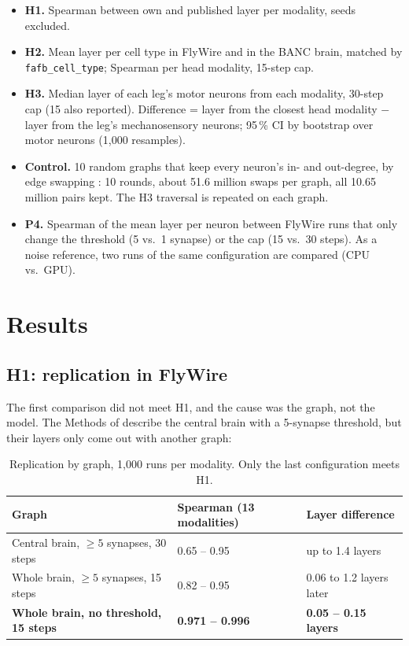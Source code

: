 \documentclass[11pt,letterpaper]{article}
\begin{document}
\begin{itemize}
  \item \textbf{H1.} Spearman between own and published layer per modality, seeds excluded.
  \item \textbf{H2.} Mean layer per cell type in FlyWire and in the BANC brain, matched by \texttt{fafb\_cell\_type}; Spearman per head modality, 15-step cap.
  \item \textbf{H3.} Median layer of each leg's motor neurons from each modality, 30-step cap (15 also reported). Difference = layer from the closest head modality $-$ layer from the leg's mechanosensory neurons; 95\,\% CI by bootstrap over motor neurons (1{,}000 resamples).
  \item \textbf{Control.} 10 random graphs that keep every neuron's in- and out-degree, by edge swapping \citep{maslov2002}: 10 rounds, about 51.6 million swaps per graph, all 10.65 million pairs kept. The H3 traversal is repeated on each graph.
  \item \textbf{P4.} Spearman of the mean layer per neuron between FlyWire runs that only change the threshold (5 vs.\ 1 synapse) or the cap (15 vs.\ 30 steps). As a noise reference, two runs of the same configuration are compared (CPU vs.\ GPU).
\end{itemize}

\section{Results}

\subsection{H1: replication in FlyWire}

The first comparison did not meet H1, and the cause was the graph, not the model. The Methods of \citet{dorkenwald2024} describe the central brain with a 5-synapse threshold, but their layers only come out with another graph:

\begin{table}[H]
\centering
\small
\begin{tabularx}{\linewidth}{@{}LXX@{}}
\toprule
\textbf{Graph} & \textbf{Spearman (13 modalities)} & \textbf{Layer difference} \\
\midrule
Central brain, $\ge 5$ synapses, 30 steps & 0.65 -- 0.95 & up to 1.4 layers \\
Whole brain, $\ge 5$ synapses, 15 steps & 0.82 -- 0.95 & 0.06 to 1.2 layers later \\
\textbf{Whole brain, no threshold, 15 steps} & \textbf{0.971 -- 0.996} & \textbf{0.05 -- 0.15 layers} \\
\bottomrule
\end{tabularx}
\caption{Replication by graph, 1{,}000 runs per modality. Only the last configuration meets H1.}
\end{table}
\end{document}
